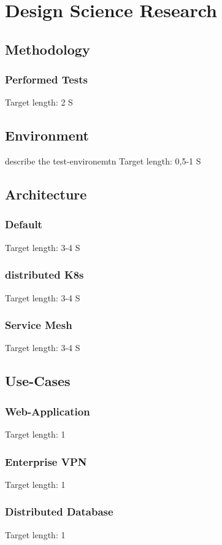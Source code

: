 \documentclass[MSC,Master,english]{twbook}%
\begin{document}
\chapter{Design Science Research}
\label{chap:dsr}

\section{Methodology}
\label{sec:dsrmethode}
\subsection{Performed Tests}
Target length: 2 S

\section{Environment}
\label{sec:env}
describe the test-environemtn
Target length: 0,5-1 S

\section{Architecture}
\label{sec:dsrarchitecture}
\subsection{Default}
Target length: 3-4 S
\subsection{distributed K8s}
Target length: 3-4 S
\subsection{Service Mesh}
Target length: 3-4 S

\section{Use-Cases}
\subsection{Web-Application}
Target length: 1
\subsection{Enterprise VPN}
Target length: 1
\subsection{Distributed Database}
Target length: 1
\end{document}
